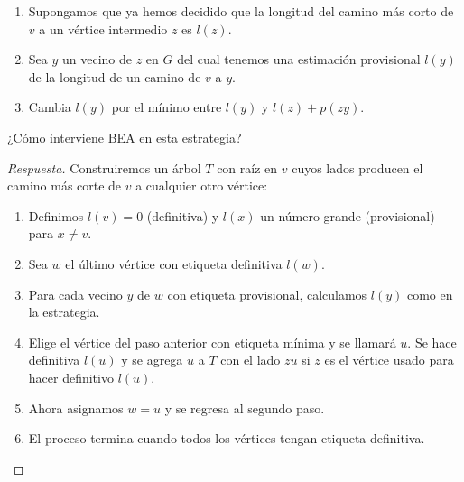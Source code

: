 \begin{enumerate}
    \item Supongamos que ya hemos decidido que la longitud del camino más corto de $v$ a un vértice intermedio $z$ es $l(z)$.
    \item Sea $y$ un vecino de $z$ en $G$ del cual tenemos una estimación provisional $l(y)$ de la longitud de un camino de $v$ a $y$.
    \item Cambia $l(y)$ por el mínimo entre $l(y)$ y $l(z) + p(zy)$.
\end{enumerate}

\begin{pre}
    ¿Cómo interviene BEA en esta estrategia?
\end{pre}

\begin{proof}[Respuesta]

    Construiremos un árbol $T$ con raíz en $v$ cuyos lados producen el camino más corte de $v$ a cualquier otro vértice:
    
    \begin{enumerate}
        \item Definimos $l(v) = 0$ (definitiva) y $l(x)$ un número grande (provisional) para $x \neq v$.
        \item Sea $w$ el último vértice con etiqueta definitiva $l(w)$.
        \item Para cada vecino $y$ de $w$ con etiqueta provisional, calculamos $l(y)$ como en la estrategia.
        \item Elige el vértice del paso anterior con etiqueta mínima y se llamará $u$. Se hace definitiva $l(u)$ y se agrega $u$ a $T$ con el lado $zu$ si $z$ es el vértice usado para hacer definitivo $l(u)$.
        \item Ahora asignamos $w = u$ y se regresa al segundo paso.
        \item El proceso termina cuando todos los vértices tengan etiqueta definitiva.
    \end{enumerate}
\end{proof}